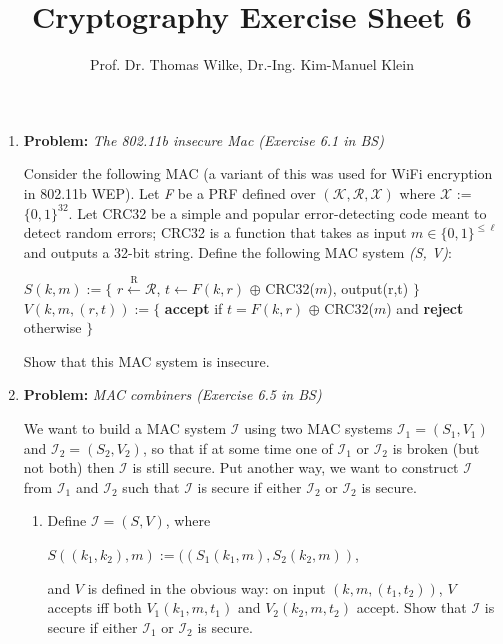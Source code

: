 \documentclass[11pt]{article}
\begin{document}
	
	\title{\textbf{Cryptography Exercise Sheet 6}}
	\author{Prof. Dr. Thomas Wilke, Dr.-Ing. Kim-Manuel Klein}
	\maketitle
	\medskip
	
	\begin{enumerate}
		
		\item
		\textbf{Problem:} \textit{The 802.11b insecure Mac (Exercise 6.1 in BS)}
		
		Consider the following MAC (a variant of this was used for
		WiFi encryption in 802.11b WEP). Let \textit{F} be a PRF defined over $(\mathcal{K}, \mathcal{R}, \mathcal{X})$ where $\mathcal{X}$ := $\{0, 1\}^{32}$. Let CRC32 be a simple and popular error-detecting code meant to detect random errors; CRC32 is
		a function that takes as input $m \in \{0,1\}^{\leq\ell} $ and outputs a 32-bit string. Define the following MAC
		system \textit{(S, V)}:
		
		\begin{center}
		     	$S(k,m):=\big\{$ $r \xleftarrow{\text{R}} \mathcal{R}$, $ t \xleftarrow{} F(k,r)$ $\oplus$ CRC32($m$), output(r,t) $\big\}$\newline
			$V(k,m, (r,t)):=\big\{$ {\bf accept} if $t = F(k,r)$ $\oplus$ CRC32($m$) and {\bf reject} otherwise $\big\}$
		\end{center}
	
	Show that this MAC system is insecure.
	
		\item
        \textbf{Problem:} \textit{MAC combiners (Exercise 6.5 in BS)}
        
      We want to build a MAC system $\mathcal{I}$ using two MAC systems $\mathcal{I}_1 = (S_1 , V_1 )$
      and $\mathcal{I}_2 = (S_2 , V_2 )$, so that if at some time one of $\mathcal{I}_1$ or $\mathcal{I}_2$ is broken (but not both) then $\mathcal{I}$ is still secure. Put another way, we want to construct $\mathcal{I}$ from $\mathcal{I}_1$ and $\mathcal{I}_2$ such that $\mathcal{I}$ is secure if either $\mathcal{I}_2$ or $\mathcal{I}_2$ is secure.
      
      \begin{enumerate}
      	\item Define $\mathcal{I} = (S,V)$, where
      		\begin{center}
      			$S((k_1, k_2), m):= ((S_1(k_1,m), S_2(k_2,m))$,
      		\end{center}
      	and $V$ is defined in the obvious way: on input $(k, m, (t_1 , t_2 ))$, $V$ accepts iff both $V_1 (k_1 , m, t_1 )$
      	and $V_2 (k_2 , m, t_2 )$ accept. Show that $\mathcal{I}$ is secure if either $\mathcal{I}_1$ or $\mathcal{I}_2$ is secure.
      	

\end{enumerate}
\end{enumerate}
\end{document}
